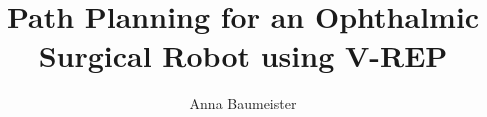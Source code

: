 \documentclass[11pt,a4paper,footexclude,headsepline,footsepline,BCOR12mm,DIV13]{scrbook}
\author{Anna Baumeister}
\title{Path Planning for an Ophthalmic Surgical Robot using V-REP}
\begin{document}

\cleardoublepage




\tableofcontents{}









\end{document}
